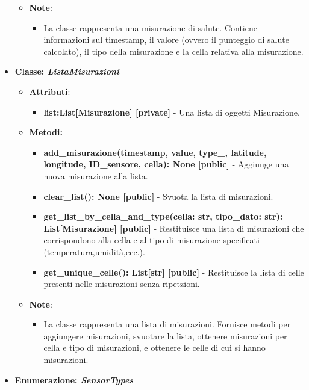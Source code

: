 \begin{itemize}
\begin{itemize}
\begin{itemize}
    \end{itemize}
    \item\textbf{Note}:
        \begin{itemize}
            \item La classe rappresenta una misurazione di salute. Contiene informazioni sul timestamp, il valore (ovvero il punteggio di salute calcolato), il tipo della misurazione e la cella relativa alla misurazione.
        \end{itemize}
    \end{itemize}
    \item\textbf{Classe: \textit{ListaMisurazioni}}
    \begin{itemize}
    \item\textbf{Attributi}:
        \begin{itemize}
        \item \textbf{list:List[Misurazione] [private]} - Una lista di oggetti Misurazione.
    \end{itemize}
    \item \textbf{Metodi: }
    \begin{itemize}
        \item \textbf{add\_misurazione(timestamp, value, type\_, latitude, longitude, ID\_sensore, cella): None [public]} - Aggiunge una nuova misurazione alla lista.
        \item \textbf{clear\_list(): None [public]} - Svuota la lista di misurazioni.
        \item \textbf{get\_list\_by\_cella\_and\_type(cella: str, tipo\_dato: str): List[Misurazione] [public]} - Restituisce una lista di misurazioni che corrispondono alla cella e al tipo di misurazione specificati (temperatura,umidità,ecc.).
        \item \textbf{get\_unique\_celle(): List[str] [public]} - Restituisce la lista di celle presenti nelle misurazioni senza ripetzioni.
    \end{itemize}
    \item\textbf{Note}:
        \begin{itemize}
            \item La classe rappresenta una lista di misurazioni. Fornisce metodi per aggiungere misurazioni, svuotare la lista, ottenere misurazioni per cella e tipo di misurazioni, e ottenere le celle di cui si hanno misurazioni.
        \end{itemize}
    \end{itemize}
    \item\textbf{Enumerazione: \textit{SensorTypes}}

\end{itemize}
